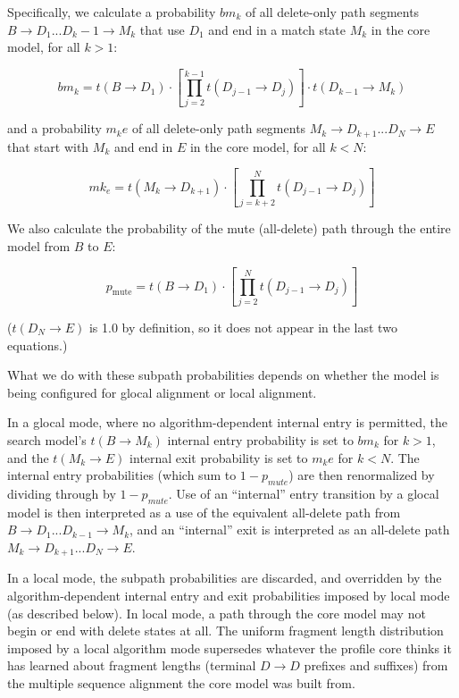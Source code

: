 \documentclass[11pt]{article}
\begin{document}
Specifically, we calculate a probability $bm_k$ of all delete-only
path segments $B \rightarrow D_1 ... D_k-1 \rightarrow M_k$ that use
$D_1$ and end in a match state $M_k$ in the core model, for all $k>1$:

\begin{equation}
   bm_k = t(B \rightarrow D_1) \cdot
            \left[ \prod_{j=2}^{k-1} t(D_{j-1} \rightarrow D_j) \right] \cdot
            t(D_{k-1} \rightarrow M_k)
\end{equation}

and a probability $m_ke$ of all delete-only path segments $M_k
\rightarrow D_{k+1}...D_N \rightarrow E$ that start with $M_k$ and end
in $E$ in the core model, for all $k<N$:

\begin{equation}
   mk_e = t(M_k \rightarrow D_{k+1}) \cdot
            \left[ \prod_{j=k+2}^{N} t(D_{j-1} \rightarrow D_j) \right] 
\end{equation}

We also calculate the probability of the mute (all-delete) path
through the entire model from $B$ to $E$:

\begin{equation}
  p_{\mbox{mute}} =  t(B \rightarrow D_1) \cdot
       \left[ \prod_{j=2}^{N} t(D_{j-1} \rightarrow D_j) \right] 
\end{equation}

($t(D_N \rightarrow E)$ is 1.0 by definition, so it does not appear in
the last two equations.)

What we do with these subpath probabilities depends on whether the
model is being configured for glocal alignment or local alignment. 

In a glocal mode, where no algorithm-dependent internal entry is
permitted, the search model's $t(B \rightarrow M_k)$ internal entry
probability is set to $bm_k$ for $k>1$, and the $t(M_k \rightarrow E)$
internal exit probability is set to $m_ke$ for $k<N$. The internal
entry probabilities (which sum to $1-p_{mute}$) are then renormalized
by dividing through by $1-p_{mute}$.  Use of an ``internal'' entry
transition by a glocal model is then interpreted as a use of the
equivalent all-delete path from $B \rightarrow D_1 ... D_{k-1}
\rightarrow M_k$, and an ``internal'' exit is interpreted as an
all-delete path $M_k \rightarrow D_{k+1}...D_N \rightarrow E$.

In a local mode, the subpath probabilities are discarded, and
overridden by the algorithm-dependent internal entry and exit
probabilities imposed by local mode (as described below). In local
mode, a path through the core model may not begin or end with delete
states at all. The uniform fragment length distribution imposed by a
local algorithm mode supersedes whatever the profile core thinks it
has learned about fragment lengths (terminal $D \rightarrow D$
prefixes and suffixes) from the multiple sequence alignment the core
model was built from.
\end{document}

